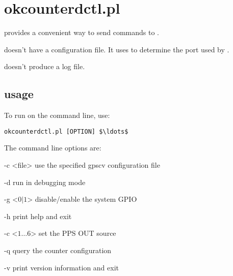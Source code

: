 \section{okcounterdctl.pl \label{s:okcounterdctl}}

 provides a convenient way to send commands to .

 doesn't have a configuration file. It uses
 to determine the port used by .

 doesn't produce a log file.

\subsection{usage}

To run  on the command line, use:
\begin{lstlisting}[mathescape=true]
okcounterdctl.pl [OPTION] $\ldots$
\end{lstlisting}
The command line options are:
\begin{description*}
	\item[-c \textless file\textgreater] use the specified gpscv configuration file
	\item[-d]	run in debugging mode
	\item[-g \textless $0|1$\textgreater] disable/enable the system GPIO
	\item[-h]	print help and exit
	\item[-c \textless $1\ldots6$\textgreater] set the PPS OUT source
	\item[-q] query the counter configuration
	\item[-v]	print version information and exit
\end{description*}

